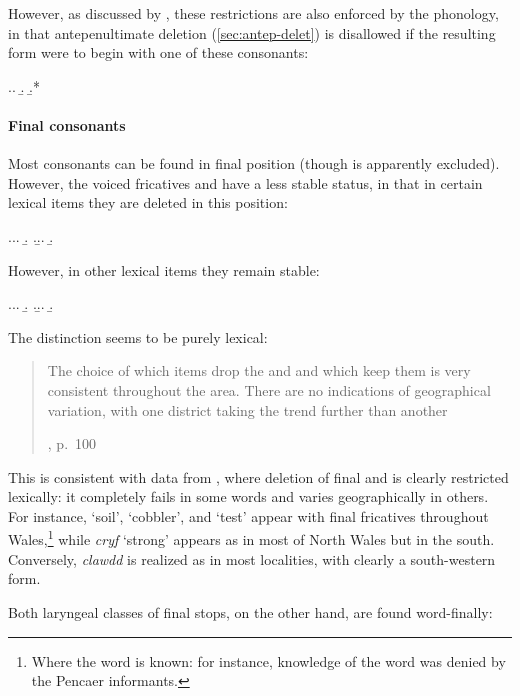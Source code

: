 However, as discussed by \citet{awbery86:_pembr_welsh}, these restrictions are also enforced by the phonology, in that antepenultimate deletion (\cref{sec:antep-delet}) is disallowed if the resulting form were to begin with one of these consonants:

\ex.\a.
\b.
\b.*\mbi{[ˈχeːlaχ]}

\paragraph{Final consonants}
\label{sec:final-consonants}

Most consonants can be found in final position (though \ipa{[h]} is apparently excluded). However, the voiced fricatives \ipa{[v]} and \ipa{[ð]} have a less stable status, in that in certain lexical items they are deleted in this position:

\ex.\a.\a.
\b.
\z.\b.\a.
\b.

However, in other lexical items they remain stable:

\ex.\a.\a.
\b.
\z.\b.\a.
\b.

The distinction seems to be purely lexical: \blockquote[\citealt{awbery86:_pembr_welsh}, p.~100]{The choice of which items drop the \ipa{[v]} and \ipa{[ð]} and which keep them is very consistent throughout the area. There are no indications of geographical variation, with one district taking the trend further than another}. This is consistent with data from \citet{thomas00:_welsh}, where deletion of final \ipa{[ð]} and \ipa{[v]} is clearly restricted lexically: it completely fails in some words and varies geographically in others. For instance, \ipa{[ˈpriːð]} `soil', \ipa{[ˈkriːð]} `cobbler', and \ipa{[ˈprauv]} `test' appear with final fricatives throughout Wales,\footnote{Where the word is known: for instance, knowledge of the word \ipa{[ˈprauv]} was denied by the Pencaer informants.} while \emph{cryf} `strong' appears as \ipa{[krɨː]} in most of North Wales but \ipa{[ˈkriːv]} in the south. Conversely, \emph{clawdd} is realized as \ipa{[ˈklauð]} in most localities, with \ipa{[ˈklau]} clearly a south-western form.

Both laryngeal classes of final stops, on the other hand, are found word-finally:

